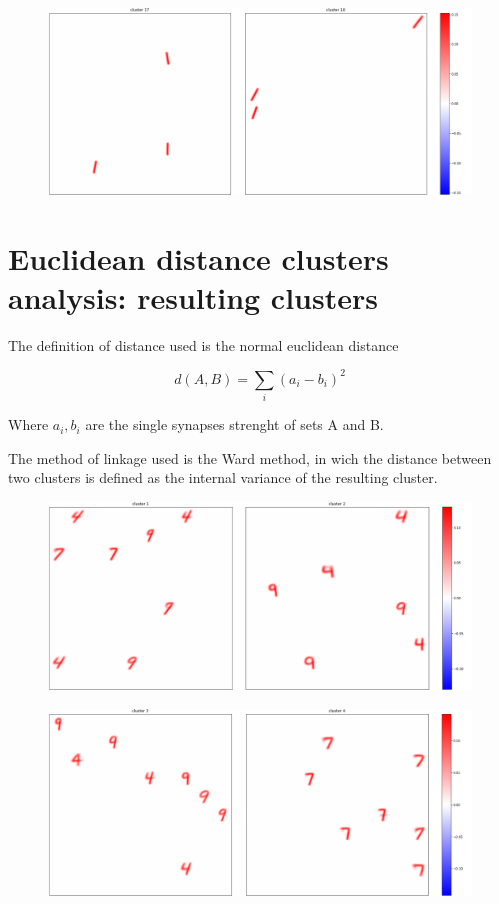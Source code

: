 \documentclass[a4paper]{report}
\begin{document}
\begin{figure} [H]
    \centering
    \includegraphics [width=\textwidth ] {c/h/17.png}
    \caption{}
\end{figure}

\chapter{Euclidean distance clusters analysis: resulting clusters}

The definition of distance used is the normal euclidean distance

\begin{equation}
    d(A,B) = \sum_i (a_i - b_i)^2
\end{equation}

Where $a_i, b_i$ are the single synapses strenght of sets A and B.

The method of linkage used is the Ward method, in wich the distance between two clusters is defined as the internal variance of the resulting cluster.

\begin{figure} [H]
    \centering
    \includegraphics [width=\textwidth ] {c/e/1.png}
    \caption{}
\end{figure}

\begin{figure} [H]
    \centering
    \includegraphics [width=\textwidth ] {c/e/3.png}
    \caption{}
\end{figure}
\end{document}
